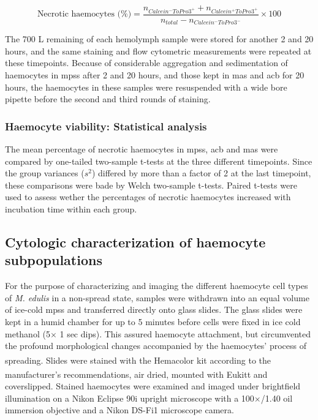\begin{equation}
    \label{eq:necrotic hemocytes}
    \text{Necrotic haemocytes (\%)} = \dfrac{n_{Calcein^{-}ToPro3^{+}} + n_{Calcein^{+}ToPro3^{+}}}{n_{total} - n_{Calcein^{-}ToPro3^{-}}} \times 100
\end{equation}

The 700 \micro L remaining of each hemolymph sample were stored for another 2 and 20 hours, and the same staining and flow cytometric measurements were repeated at these timepoints. Because of considerable aggregation and sedimentation of haemocytes in \acrshort{mpss} after 2 and 20 hours, and those kept in \acrshort{mas} and \acrshort{acb} for 20 hours, the haemocytes in these samples were resuspended with a wide bore pipette before the second and third rounds of staining.

\subsubsection{Haemocyte viability: Statistical analysis}
The mean percentage of necrotic haemocytes in \acrshort{mpss}, \acrshort{acb} and \acrshort{mas} were compared by one-tailed two-sample t-tests at the three different timepoints. Since the group variances ($s^{2}$) differed by more than a factor of 2 at the last timepoint, these comparisons were bade by Welch two-sample t-tests. Paired t-tests were used to assess wether the percentages of necrotic haemocytes increased with incubation time within each group. 

\subsection{Cytologic characterization of haemocyte subpopulations}
\label{subsection:morph}
For the purpose of characterizing and imaging the different haemocyte cell types of \emph{M. edulis} in a non-spread state, samples were withdrawn into an equal volume of ice-cold \acrshort{mpss} and transferred directly onto glass slides. The glass slides were kept in a humid chamber for up to 5 minutes before cells were fixed in ice cold methanol (5$\times$ 1 sec dips). This assured haemocyte attachment, but circumvented the profound morphological changes accompanied by the haemocytes’ process of spreading. Slides were stained with the Hemacolor\textsuperscript{\textregistered} kit according to the manufacturer’s recommendations, air dried, mounted with Eukitt\textsuperscript{\textregistered} and coverslipped. Stained haemocytes were examined and imaged under brightfield illumination on a Nikon Eclipse 90i upright microscope with a 100$\times$/1.40 oil immersion objective and a Nikon DS-Fi1 microscope camera.

